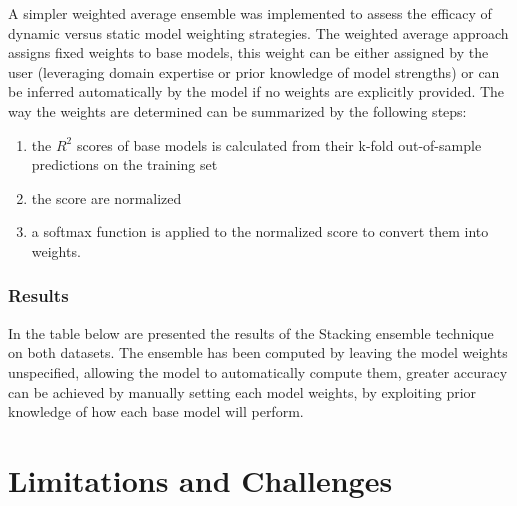 A simpler weighted average ensemble was implemented to assess the efficacy of dynamic versus static model weighting strategies. The weighted average approach assigns fixed weights to base models, this weight can be either assigned by the user (leveraging domain expertise or prior knowledge of model strengths) or can be inferred automatically by the model if no weights are explicitly provided. The way the weights are determined can be summarized by the following steps:
\begin{enumerate}
    \item the $R^2$ scores of base models is calculated from their k-fold out-of-sample predictions on the training set
    \item the score are normalized 
    \item a softmax function is applied to the normalized score to convert them into weights.
\end{enumerate}

\subsubsection{Results}
In the table below are presented the results of the Stacking ensemble technique on both datasets. The ensemble has been computed by leaving the model weights unspecified, allowing the model to automatically compute them, greater accuracy can be achieved by manually setting each model weights, by exploiting prior knowledge of how each base model will perform.
\begin{table}[h]
    \centering
    \caption{Performance metrics Weighted average ensemble}
    \label{tab: Weighted average performance}
\end{table}

\section{Limitations and Challenges}
